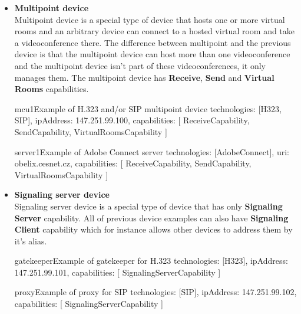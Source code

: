 \begin{itemize}
\begin{ResourceExample}{}{terminal4}%
      {Example of terminal with one virtual room for H.323 and/or SIP}
technologies: [H323, SIP],
ipAddress: 147.251.99.4,
capabilities: [
  TerminalCapability,
  ReceiveCapability,
  SendCapability
  MixCapability
]
\end{ResourceExample}

\item \textbf{Multipoint device} \\
  Multipoint device is a special type of device that hosts one or more virtual 
  rooms and an arbitrary device can connect to a hosted virtual room and take 
  a videoconference there. The difference between multipoint and the previous 
  device is that the multipoint device can host more than one videoconference 
  and the multipoint device isn't part of these videoconferences, it only 
  manages them. The multipoint device has \textbf{Receive}, \textbf{Send}
  and \textbf{Virtual Rooms} capabilities.

\begin{ResourceExample}{}{mcu1}{Example of H.323 and/or SIP multipoint device}
technologies: [H323, SIP],
ipAddress: 147.251.99.100,
capabilities: [
  ReceiveCapability,
  SendCapability,
  VirtualRoomsCapability
]
\end{ResourceExample}

\begin{ResourceExample}{}{server1}{Example of Adobe Connect server}
technologies: [AdobeConnect],
uri: obelix.cesnet.cz,
capabilities: [
  ReceiveCapability,
  SendCapability,
  VirtualRoomsCapability
]
\end{ResourceExample}

\item \textbf{Signaling server device} \\
  Signaling server device is a special type of device that has only 
  \textbf{Signaling Server} capability. All of previous device examples can 
  also have \textbf{Signaling Client} capability which for instance allows 
  other devices to address them by it's alias.
    
\begin{ResourceExample}{}{gatekeeper}{Example of gatekeeper for H.323}
technologies: [H323],
ipAddress: 147.251.99.101,
capabilities: [
  SignalingServerCapability
]
\end{ResourceExample}

\begin{ResourceExample}{}{proxy}{Example of proxy for SIP}
technologies: [SIP],
ipAddress: 147.251.99.102,
capabilities: [
  SignalingServerCapability
]
\end{ResourceExample}


\end{itemize}
